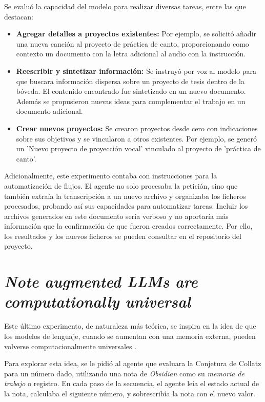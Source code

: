 Se evaluó la capacidad del modelo para realizar diversas tareas, entre las que destacan:
\begin{itemize}
    \item \textbf{Agregar detalles a proyectos existentes:} Por ejemplo, se solicitó añadir una nueva canción al proyecto de práctica de canto, proporcionando como contexto un documento con la letra adicional al audio con la instrucción.
    \item \textbf{Reescribir y sintetizar información:} Se instruyó por voz al modelo para que buscara información dispersa sobre un proyecto de tesis dentro de la bóveda. El contenido encontrado fue sintetizado en un nuevo documento. Además se propusieron nuevas ideas para complementar el trabajo en un documento adicional.
    \item \textbf{Crear nuevos proyectos:} Se crearon proyectos desde cero con indicaciones sobre sus objetivos y se vincularon a otros existentes. Por ejemplo, se generó un 'Nuevo proyecto de proyección vocal' vinculado al proyecto de 'práctica de canto'.
\end{itemize}

Adicionalmente, este experimento contaba con instrucciones para la automatización de flujos. El agente no solo procesaba la petición, sino que también extraía la transcripción a un nuevo archivo y organizaba los ficheros procesados, probando así sus capacidades para automatizar tareas. Incluir los archivos generados en este documento sería verboso y no aportaría más información que la confirmación de que fueron creados correctamente. Por ello, los resultados y los nuevos ficheros se pueden consultar en el repositorio del proyecto.

\section{\textit{Note augmented LLMs are computationally universal}}
Este último experimento, de naturaleza más teórica, se inspira en la idea de que los modelos de lenguaje, cuando se aumentan con una memoria externa, pueden volverse computacionalmente universales \parencite{schuurmansMemoryAugmentedLarge2023}.

Para explorar esta idea, se le pidió al agente que evaluara la Conjetura de Collatz para un número dado, utilizando una nota de \textit{Obsidian} como su \textit{memoria de trabajo} o registro. En cada paso de la secuencia, el agente leía el estado actual de la nota, calculaba el siguiente número, y sobrescribía la nota con el nuevo valor.

